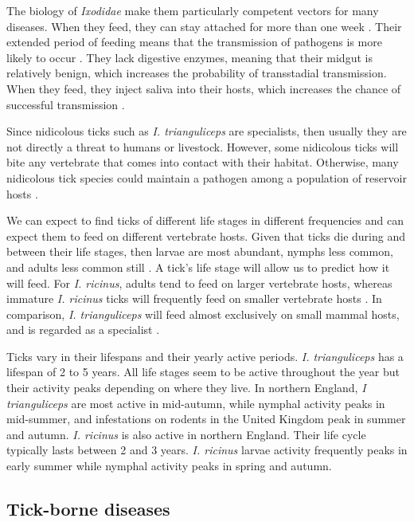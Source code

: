 \documentclass{article}
\begin{document}
The biology of \textit{Ixodidae} make them particularly competent vectors for many diseases. When they feed, they can stay attached for more than one week \cite{Johnson2023b}. Their extended period of feeding means that the transmission of pathogens is more likely to occur \cite{Gray2024}. They lack digestive enzymes, meaning that their midgut is relatively benign, which increases the probability of transstadial transmission. When they feed, they inject saliva into their hosts, which increases the chance of successful transmission \cite{Gray2024}.

Since nidicolous ticks such as \textit{I. trianguliceps} are specialists, then usually they are not directly a threat to humans or livestock. However, some nidicolous ticks will bite any vertebrate that comes into contact with their habitat. Otherwise, many nidicolous tick species could maintain a pathogen among a population of reservoir hosts \cite{gray2014}.

We can expect to find ticks of different life stages in different frequencies and can expect them to feed on different vertebrate hosts. Given that ticks die during and between their life stages, then larvae are most abundant, nymphs less common, and adults less common still \cite{Randolph1998}. A tick's life stage will allow us to predict how it will feed. For \textit{I. ricinus}, adults tend to feed on larger vertebrate hosts, whereas immature \textit{I. ricinus} ticks will frequently feed on smaller vertebrate hosts \cite{Herrmann2015, Randolph1998}. In comparison, \textit{I. trianguliceps} will feed almost exclusively on small mammal hosts, and is regarded as a specialist \cite{Bown2003, Bown2008}.

Ticks vary in their lifespans and their yearly active periods. \textit{I. trianguliceps} has a lifespan of 2 to 5 years. All life stages seem to be active throughout the year but their activity peaks depending on where they live. In northern England, \textit{I trianguliceps} are most active in mid-autumn, while nymphal activity peaks in mid-summer, and infestations on rodents in the United Kingdom peak in summer and autumn. \textit{I. ricinus} is also active in northern England. Their life cycle typically lasts between 2 and 3 years. \textit{I. ricinus} larvae activity frequently peaks in early summer while nymphal activity peaks in spring and autumn.

\subsection{Tick-borne diseases}
\end{document}
